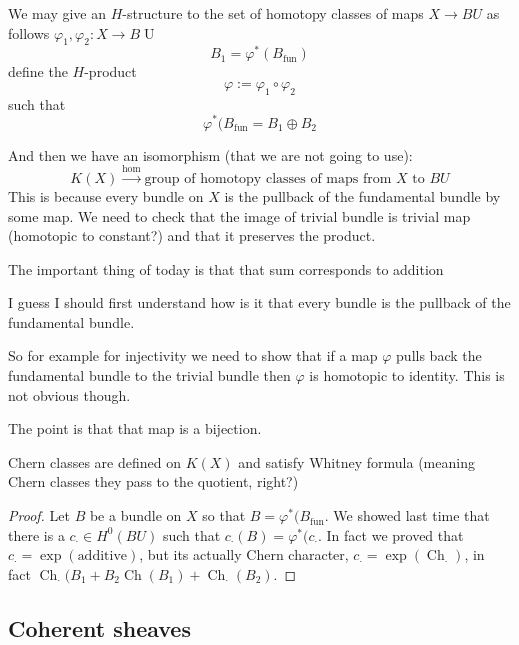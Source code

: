 \begin{remark}
	We may give an $H$-structure to the set of homotopy classes of maps $X\to BU$ as follows
	$\varphi_1,\varphi_2:X\to B\operatorname{U}$ 
	\[B_1=\varphi^* (B_{\operatorname{fun}})\]
	define the $H$-product
	\[\varphi:=\varphi_1\circ \varphi_2\]
	such that
	\[\varphi^* (B_{\operatorname{fun}}=B_1\oplus B_2\]
\end{remark}

And then we have an isomorphism (that we are not going to use):
\[K\left(X \right) \overset{\operatorname{hom}}{\longrightarrow}\text{group of homotopy classes of maps from $X$ to $BU$} \]
This is because every bundle on $X$ is the pullback of the fundamental bundle by some map. We need to check that the image of trivial bundle is trivial map (homotopic to constant?) and that it preserves the product.

\begin{remark}
	The important thing of today is that that sum corresponds to addition
\end{remark}

\begin{remark}
	I guess I should first understand how is it that every bundle is the pullback of the fundamental bundle.
\end{remark}

So for example for injectivity we need to show that if a map $\varphi$ pulls back the fundamental bundle to the trivial bundle then $\varphi$ is homotopic to identity. This is not obvious though.

The point is that that map is a bijection.

\begin{claim}
	Chern classes are defined on $K(X)$ and satisfy Whitney formula (meaning Chern classes they pass to the quotient, right?)
\end{claim}

\begin{proof}
	Let $B$ be a bundle on $X$ so that $B=\varphi^* (B_{\operatorname{fun}}$. We showed last time that there is a $c_{\cdot}\in H^{0}(BU)$ such that $c_{\cdot}(B)=\varphi^* (c_{\cdot}$. In fact we proved that $c_{\cdot}= \operatorname{exp}(\text{additive} )$, but its actually Chern character, $c_{\cdot}=\operatorname{exp}(\operatorname{Ch}_{\cdot})$, in fact $\operatorname{Ch}_{\cdot}(B_1+B_2\operatorname{Ch}(B_1)+\operatorname{Ch}_{\cdot}(B_2)$.
\end{proof}

\subsection{Coherent sheaves}

